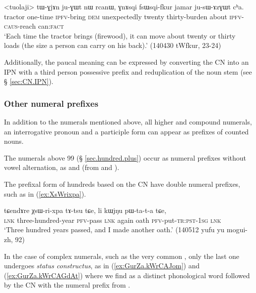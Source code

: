 \begin{exe}
\ex \label{ex:GnAsqi.fsWqifkur}
\gll <tuolaji> tɯ-ɣjɤn ju-ɣɯt nɯ rcanɯ, ɣnɤsqi fsɯsqi-fkur jamar ju-sɯ-ɤzɣɯt cʰa.  \\
 tractor one-time \textsc{ipfv}-bring \textsc{dem} unexpectedly twenty thirty-burden about \textsc{ipfv}-\textsc{caus}-reach can:\textsc{fact} \\
\glt `Each time the tractor brings (firewood), it can move about twenty or thirty loads (the size a person can carry on his back).' (140430 tWfkur, 23-24)
\end{exe}

Additionally, the paucal meaning can be expressed by converting the CN into an IPN with a third person possessive prefix and reduplication of the noun stem (see § \ref{sec:CN.IPN}).

\subsubsection{Other numeral prefixes} \label{sec:other.numeral.prefixes}
In addition to the numerals mentioned above, all higher and compound numerals, an interrogative pronoun and a participle form can appear as prefixes of counted nouns.

The numerals above 99 (§ \ref{sec.hundred.plus}) occur as numeral prefixes without vowel alternation, as  and  (from  and ). 

The prefixal form of hundreds based on the CN  have double numeral prefixes, such as  in (\ref{ex:XsWrixpa}).

\begin{exe}
\ex \label{ex:XsWrixpa}
\gll tɕendɤre χsɯ-ri-xpa tɤ-tsu tɕe, li kɯjŋu pɯ-ta-t-a tɕe, \\
 \textsc{lnk} three-hundred-year \textsc{pfv}-pass \textsc{lnk} again oath \textsc{pfv}-put-\textsc{tr}:\textsc{pst}-\textsc{1sg} \textsc{lnk} \\
\glt `Three hundred years passed, and I made another oath.' (140512 yufu yu mogui-zh, 92)
\end{exe}

In the case of complex numerals, such as the very common , only the last one undergoes \textit{status constructus}, as in (\ref{ex:GurZa.kWrCAJom}) and (\ref{ex:GurZa.kWrCAGdAt}) where we find  as a distinct phonological word followed by the CN with the numeral prefix  from .

